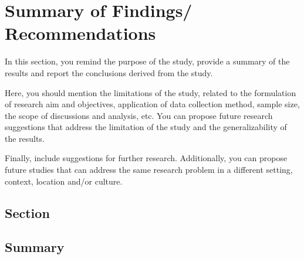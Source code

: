 \chapter{Summary of Findings/ Recommendations}
\label{label18}

In this section, you remind the purpose of the study, provide a summary of the results and report the conclusions derived from the study.

Here, you should mention the limitations of the study, related to the formulation of research aim and objectives, application of data collection method, sample size, the scope of discussions and analysis, etc. You can propose future research suggestions that address the limitation of the study and the generalizability of the results.

Finally, include suggestions for further research. Additionally, you can propose future studies that can address the same research problem in a different setting, context, location and/or culture.



\section{Section}
\label{label19}


\section{Summary}